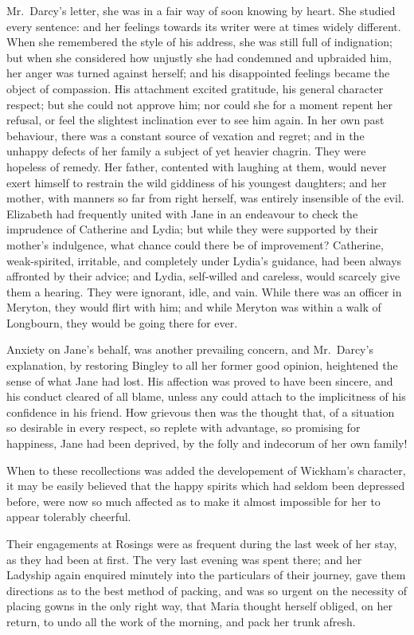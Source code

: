 Mr.\ Darcy’s letter, she was in a fair way of soon knowing
by heart. She studied every sentence: and her feelings
towards its writer were at times widely different. When
she remembered the style of his address, she was still
full of indignation; but when she considered how unjustly
she had condemned and upbraided him, her anger was
turned against herself; and his disappointed feelings
became the object of compassion. His attachment excited
gratitude, his general character respect; but she could
not approve him; nor could she for a moment repent
her refusal, or feel the slightest inclination ever to see
him again. In her own past behaviour, there was a constant
source of vexation and regret; and in the unhappy
defects of her family a subject of yet heavier chagrin.
They were hopeless of remedy. Her father, contented
with laughing at them, would never exert himself to
restrain the wild giddiness of his youngest daughters; and
her mother, with manners so far from right herself, was
entirely insensible of the evil. Elizabeth had frequently
united with Jane in an endeavour to check the imprudence
of Catherine and Lydia; but while they were supported
by their mother’s indulgence, what chance could there be
of improvement? Catherine, weak-spirited, irritable, and
completely under Lydia’s guidance, had been always
affronted by their advice; and Lydia, self-willed and
careless, would scarcely give them a hearing. They were
ignorant, idle, and vain. While there was an officer in
Meryton, they would flirt with him; and while Meryton
was within a walk of Longbourn, they would be going
there for ever.

Anxiety on Jane’s behalf, was another prevailing concern,
and Mr.\ Darcy’s explanation, by restoring Bingley
to all her former good opinion, heightened the sense of
what Jane had lost. His affection was proved to have
been sincere, and his conduct cleared of all blame, unless
any could attach to the implicitness of his confidence in
his friend. How grievous then was the thought that,
of a situation so desirable in every respect, so replete
with advantage, so promising for happiness, Jane had
been deprived, by the folly and indecorum of her own
family!

When to these recollections was added the developement
of Wickham’s character, it may be easily believed that
the happy spirits which had seldom been depressed before,
were now so much affected as to make it almost impossible
for her to appear tolerably cheerful.

Their engagements at Rosings were as frequent during
the last week of her stay, as they had been at first. The
very last evening was spent there; and her Ladyship
again enquired minutely into the particulars of their
journey, gave them directions as to the best method of
packing, and was so urgent on the necessity of placing
gowns in the only right way, that Maria thought herself
obliged, on her return, to undo all the work of the morning,
and pack her trunk afresh.

